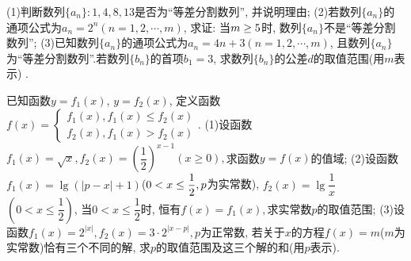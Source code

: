 \documentclass[10pt,a4paper]{article}
\begin{document}
(1)判断数列$\{a_n\}:1,4,8,13$是否为``等差分割数列'', 并说明理由;
(2)若数列$\{a_n\}$的通项公式为$a_n=2^n(n=1,2,\cdots ,m)$, 求证: 当$m\ge \text5$时, 数列$\{a_n\}$不是``等差分割数列'';
(3)已知数列$\{a_n\}$的通项公式为$a_n=4n+3(n=1,2,\cdots ,m)$, 且数列$\{a_n\}$为``等差分割数列''.若数列$\{b_n\}$的首项$b_1=3$, 求数列$\{b_n\}$的公差$d$的取值范围(用$m$表示) .
\item 已知函数$y=f_1(x)$, $y=f_2(x)$, 定义函数$f(x)=\begin{cases} f_1(x),f_1(x)\le f_2(x) \\ f_2(x),f_1(x)>f_2(x) \end{cases}$.
(1)设函数$f_1(x)=\sqrt x,f_2(x)=(\dfrac 12)^{x-1}(x\ge 0),$求函数$y=f(x)$的值域;
(2)设函数$f_1(x)=\lg (|p-x|+1)$($\text0<x\le \dfrac 12,p$为实常数), $f_2(x)=\lg \dfrac 1x$ $(0<x\le \dfrac 12)$, 当$0<x\le \dfrac 12$时, 恒有$f(x)=f_1(x),$求实常数$p$的取值范围;
(3)设函数$f_1(x)=2^{|x|},f_2(x)=3\cdot 2^{|x-p|},p$为正常数, 若关于$x$的方程$f(x)=m$($m$为实常数)恰有三个不同的解, 求$p$的取值范围及这三个解的和(用$p$表示).
\end{document}
